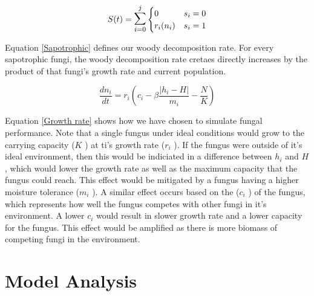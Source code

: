 \documentclass[twocolumn]{article} %
\begin{document}
\begin{equation} \label{Sapotrophic}
    S(t) = \mathlarger{\mathlarger{\sum}}_{i=0}^{j} 
    \begin{cases}
	    0 & s_i = 0\\
	    r_i (n_i) & s_i = 1
    \end{cases}
\end{equation}

\noindent Equation \ref{Sapotrophic} defines our woody decomposition rate. For every sapotrophic fungi, the woody decomposition rate cretaes directly increases by the product of that fungi's growth rate and current population.

\begin{equation}\label{Growth rate}
    \frac{dn_i}{dt} = r_i \left(c_i - \beta\frac{\left| h_i - H\right|}{m_i} - \frac{N}{K} \right)
\end{equation}

Equation \ref{Growth rate} shows how we have chosen to simulate fungal performance. Note that a single fungus under ideal conditions would grow to the carrying capacity ($ K $ ) at ti's growth rate ($ r_i $ ). If the fungus were outside of it's ideal environment, then this would be indiciated in a difference between $ h_i $ and $ H $, which would lower the growth rate as well as the maximum capacity that the fungus could reach. This effect would be mitigated by a fungus having a higher moisture tolerance ($ m_i $ ). A similar effect occurs based on the ($ c_i $ ) of the fungus, which represents how well the fungus competes with other fungi in it's environment. A lower $ c_i $ would result in slower growth rate and a lower capacity for the fungus. This effect would be amplified as there is more biomass of competing fungi in the environment. 


\section{Model Analysis}
\end{document}
